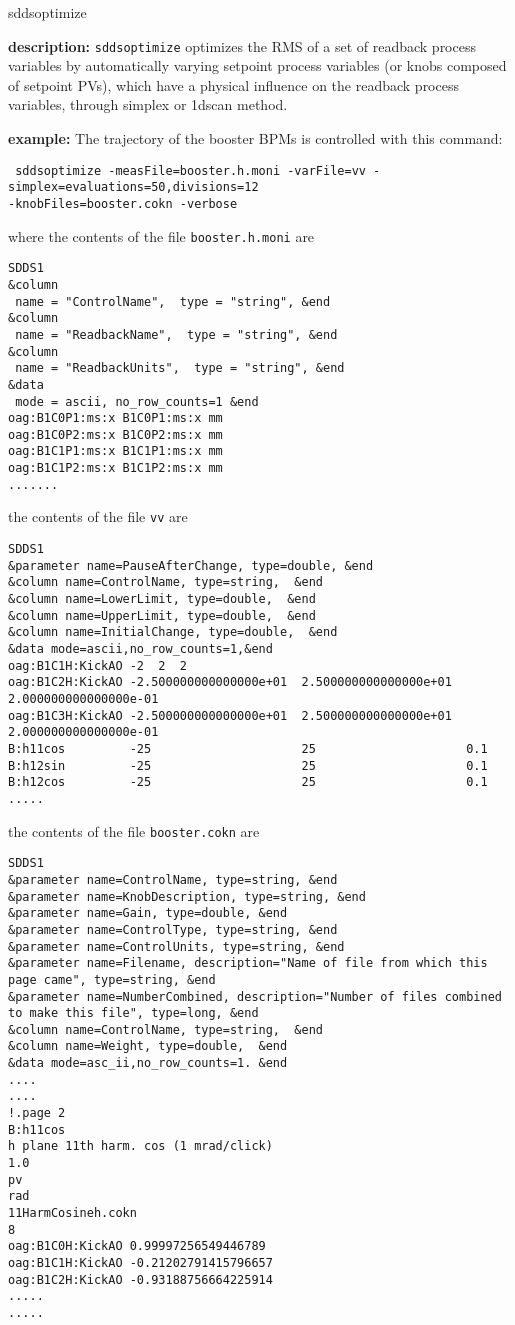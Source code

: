 \begin{sddsprog}{sddsoptimize}
\item {\bf description:}
\verb+sddsoptimize+ optimizes the RMS of a set of readback process variables by automatically varying setpoint process variables (or knobs composed of setpoint PVs), which have a physical influence on the readback process variables, through simplex or 1dscan method.   

\item {\bf example:} 
% 
The trajectory of the booster BPMs is controlled with this command:
\begin{flushleft}{\tt
sddsoptimize -measFile=booster.h.moni -varFile=vv -simplex=evaluations=50,divisions=12\\
\quad -knobFiles=booster.cokn -verbose
}\end{flushleft}
where the contents of the file \verb+booster.h.moni+ are
\begin{verbatim}
SDDS1
&column
 name = "ControlName",  type = "string", &end
&column
 name = "ReadbackName",  type = "string", &end
&column             
 name = "ReadbackUnits",  type = "string", &end
&data
 mode = ascii, no_row_counts=1 &end
oag:B1C0P1:ms:x B1C0P1:ms:x mm
oag:B1C0P2:ms:x B1C0P2:ms:x mm
oag:B1C1P1:ms:x B1C1P1:ms:x mm
oag:B1C1P2:ms:x B1C1P2:ms:x mm
.......

\end{verbatim}
the contents of the file \verb+vv+ are
\begin{verbatim}
SDDS1
&parameter name=PauseAfterChange, type=double, &end
&column name=ControlName, type=string,  &end
&column name=LowerLimit, type=double,  &end
&column name=UpperLimit, type=double,  &end
&column name=InitialChange, type=double,  &end
&data mode=ascii,no_row_counts=1,&end
oag:B1C1H:KickAO -2  2  2 
oag:B1C2H:KickAO -2.500000000000000e+01  2.500000000000000e+01  2.000000000000000e-01 
oag:B1C3H:KickAO -2.500000000000000e+01  2.500000000000000e+01  2.000000000000000e-01 
B:h11cos         -25                     25                     0.1
B:h12sin         -25                     25                     0.1
B:h12cos         -25                     25                     0.1
.....

\end{verbatim}
the contents of the file \verb+booster.cokn+ are
\begin{verbatim}
SDDS1
&parameter name=ControlName, type=string, &end
&parameter name=KnobDescription, type=string, &end
&parameter name=Gain, type=double, &end
&parameter name=ControlType, type=string, &end
&parameter name=ControlUnits, type=string, &end
&parameter name=Filename, description="Name of file from which this page came", type=string, &end
&parameter name=NumberCombined, description="Number of files combined to make this file", type=long, &end
&column name=ControlName, type=string,  &end
&column name=Weight, type=double,  &end
&data mode=asc_ii,no_row_counts=1. &end
....
....
!.page 2
B:h11cos
h plane 11th harm. cos (1 mrad/click)
1.0
pv
rad
11HarmCosineh.cokn
8
oag:B1C0H:KickAO 0.99997256549446789
oag:B1C1H:KickAO -0.21202791415796657
oag:B1C2H:KickAO -0.93188756664225914
.....
.....


\end{verbatim}
\end{sddsprog}
